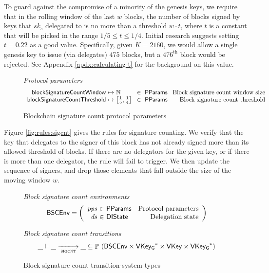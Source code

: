 \documentclass[11pt,a4paper]{article}
\newcommand{\powerset}[1]{\mathbb{P}~#1}
\newcommand{\var}[1]{\mathit{#1}}
\newcommand{\type}[1]{\mathsf{#1}}
\newcommand{\pp}[1]{\mathsf{#1}}
\newcommand{\trans}[2]{\xlongrightarrow[\textsc{#1}]{#2}}
\newcommand{\seqof}[1]{#1^{*}}
\newcommand{\partialf}{\mapsto}
\newcommand{\VKey}{\type{VKey}}
\newcommand{\VKeyGen}{\type{VKey_G}}
\newcommand{\DelegState}{\type{DIState}}
\newcommand{\ProtParams}{\type{PParams}} %
\begin{document}
\newcommand{\BSCEnv}{\type{BSCEnv}}
\newcommand{\BSCState}{\type{BSCState}}

To guard against the compromise of a minority of the genesis keys,
we require that in the rolling window of the last $w$ blocks, the number of
blocks signed by keys that $sk_s$ delegated to is no more than a threshold $w
\cdot t$, where $t$ is a constant that will be picked in the range
$1/5 \leq t \leq 1/4$. Initial research suggests setting $t=0.22$ as a good
value. Specifically, given $K=2160$, we would allow a single genesis key to
issue (via delegates) $475$ blocks, but a $476^{\text{th}}$ block would be
rejected. See Appendix \ref{apdx:calculating-t} for the background on this value.

\begin{figure}[ht]
  \emph{Protocol parameters}
  \begin{equation*}
    \begin{array}{r@{~\partialf~}l!{~\in~\ProtParams~}r}
      \pp{blockSignatureCountWindow} & \mathbb{N} & \text{Block signature count window size} \\
      \pp{blockSignatureCountThreshold} & \left[\frac{1}{5}, \frac{1}{4}\right] & \text{Block signature count threshold} \\
    \end{array}
  \end{equation*}
  \caption{Blockchain signature count protocol parameters}
  \label{fig:defs:sigcnt}
\end{figure}

Figure \ref{fig:rules:sigcnt} gives the rules for signature counting. We verify
that the key that delegates to the signer of this block has not already signed
more than its allowed threshold of blocks. If there are no delegators for the
given key, or if there is more than one delegator, the rule will fail to trigger.
%
We then update the sequence of signers, and drop those elements that fall
outside the size of the moving window $w$.

\begin{figure}[ht]
  \emph{Block signature count environments}
  \begin{equation*}
    \BSCEnv =
    \left(
      \begin{array}{r@{~\in~}lr}
        \var{pps} & \ProtParams & \text{Protocol parameters} \\
        \var{ds} & \DelegState & \text{Delegation state} \\
      \end{array}
    \right)
  \end{equation*}

  \emph{Block signature count transitions}
  \begin{equation*}
    \_ \vdash \var{\_} \trans{sigcnt}{\_} \var{\_} \subseteq
    \powerset (\BSCEnv \times \seqof{\VKeyGen} \times \VKey \times \seqof{\VKeyGen})
  \end{equation*}
  \caption{Block signature count transition-system types}
  \label{fig:ts-types:sigcnt}
\end{figure}
\end{document}

